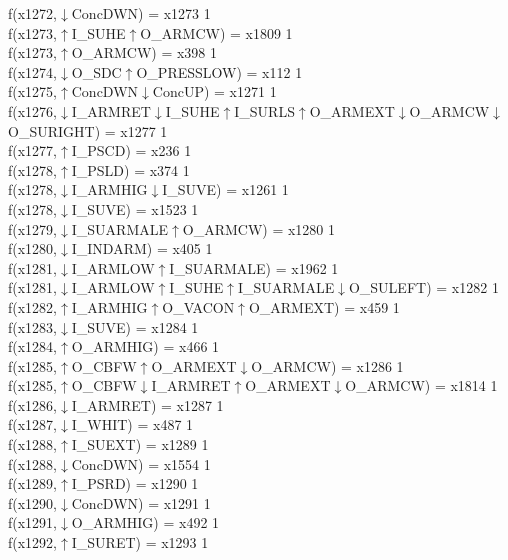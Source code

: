 f(x1272,$\downarrow$ConcDWN) = x1273 {1} \\
f(x1273,$\uparrow$I\_SUHE$\uparrow$O\_ARMCW) = x1809 {1} \\
f(x1273,$\uparrow$O\_ARMCW) = x398 {1} \\
f(x1274,$\downarrow$O\_SDC$\uparrow$O\_PRESSLOW) = x112 {1} \\
f(x1275,$\uparrow$ConcDWN$\downarrow$ConcUP) = x1271 {1} \\
f(x1276,$\downarrow$I\_ARMRET$\downarrow$I\_SUHE$\uparrow$I\_SURLS$\uparrow$O\_ARMEXT$\downarrow$O\_ARMCW$\downarrow$O\_SURIGHT) = x1277 {1} \\
f(x1277,$\uparrow$I\_PSCD) = x236 {1} \\
f(x1278,$\uparrow$I\_PSLD) = x374 {1} \\
f(x1278,$\downarrow$I\_ARMHIG$\downarrow$I\_SUVE) = x1261 {1} \\
f(x1278,$\downarrow$I\_SUVE) = x1523 {1} \\
f(x1279,$\downarrow$I\_SUARMALE$\uparrow$O\_ARMCW) = x1280 {1} \\
f(x1280,$\downarrow$I\_INDARM) = x405 {1} \\
f(x1281,$\downarrow$I\_ARMLOW$\uparrow$I\_SUARMALE) = x1962 {1} \\
f(x1281,$\downarrow$I\_ARMLOW$\uparrow$I\_SUHE$\uparrow$I\_SUARMALE$\downarrow$O\_SULEFT) = x1282 {1} \\
f(x1282,$\uparrow$I\_ARMHIG$\uparrow$O\_VACON$\uparrow$O\_ARMEXT) = x459 {1} \\
f(x1283,$\downarrow$I\_SUVE) = x1284 {1} \\
f(x1284,$\uparrow$O\_ARMHIG) = x466 {1} \\
f(x1285,$\uparrow$O\_CBFW$\uparrow$O\_ARMEXT$\downarrow$O\_ARMCW) = x1286 {1} \\
f(x1285,$\uparrow$O\_CBFW$\downarrow$I\_ARMRET$\uparrow$O\_ARMEXT$\downarrow$O\_ARMCW) = x1814 {1} \\
f(x1286,$\downarrow$I\_ARMRET) = x1287 {1} \\
f(x1287,$\downarrow$I\_WHIT) = x487 {1} \\
f(x1288,$\uparrow$I\_SUEXT) = x1289 {1} \\
f(x1288,$\downarrow$ConcDWN) = x1554 {1} \\
f(x1289,$\uparrow$I\_PSRD) = x1290 {1} \\
f(x1290,$\downarrow$ConcDWN) = x1291 {1} \\
f(x1291,$\downarrow$O\_ARMHIG) = x492 {1} \\
f(x1292,$\uparrow$I\_SURET) = x1293 {1} \\
